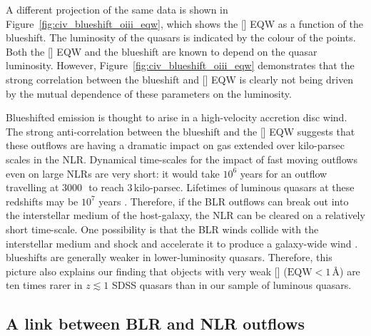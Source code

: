 A different projection of the same data is shown in Figure~\ref{fig:civ_blueshift_oiii_eqw}, which shows the [] EQW as a function of the  blueshift.
The luminosity of the quasars is indicated by the colour of the points.
Both the [] EQW and the  blueshift are known to depend on the quasar luminosity.
However, Figure~\ref{fig:civ_blueshift_oiii_eqw} demonstrates that the strong correlation between the  blueshift and [] EQW is clearly not being driven by the mutual dependence of these parameters on the luminosity.

Blueshifted  emission is thought to arise in a high-velocity accretion disc wind.
The strong anti-correlation between the  blueshift and the [] EQW suggests that these outflows are having a dramatic impact on gas extended over kilo-parsec scales in the NLR.
Dynamical time-scales for the impact of fast moving outflows even on large NLRs are very short: it would take $10^6$ years for an outflow travelling at $3000$\,\kms\, to reach $3$\,kilo-parsec.
Lifetimes of luminous quasars at these redshifts may be $10^7$ years \citep[e.g.][]{martini01}.
Therefore, if the BLR outflows can break out into the interstellar medium of the host-galaxy, the NLR can be cleared on a relatively short time-scale.
One possibility is that the BLR winds collide with the interstellar medium and shock and accelerate it to produce a galaxy-wide wind \citep[e.g.][]{king11,faucher12}.
 blueshifts are generally weaker in lower-luminosity quasars.
Therefore, this picture also explains our finding that objects with very weak [] ($\text{EQW} < 1$\,\AA) are ten times rarer in $z \lesssim 1$ SDSS quasars than in our sample of luminous quasars.

\subsection{A link between BLR and NLR outflows}

